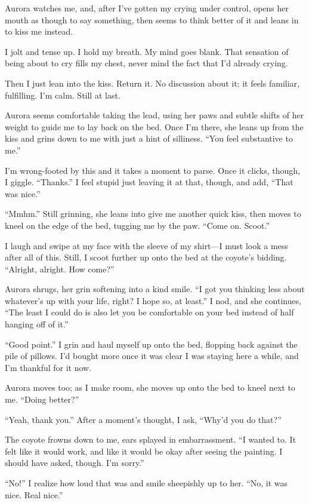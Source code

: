 Aurora watches me, and, after I've gotten my crying under control, opens her mouth as though to say something, then seems to think better of it and leans in to kiss me instead.

I jolt and tense up. I hold my breath. My mind goes blank. That sensation of being about to cry fills my chest, never mind the fact that I'd already crying.

Then I just lean into the kiss. Return it. No discussion about it; it feels familiar, fulfilling. I'm calm. Still at last.

Aurora seems comfortable taking the lead, using her paws and subtle shifts of her weight to guide me to lay back on the bed. Once I'm there, she leans up from the kiss and grins down to me with just a hint of silliness. ``You feel substantive to me.''

I'm wrong-footed by this and it takes a moment to parse. Once it clicks, though, I giggle. ``Thanks.'' I feel stupid just leaving it at that, though, and add, ``That was nice.''

``Mmhm.'' Still grinning, she leans into give me another quick kiss, then moves to kneel on the edge of the bed, tugging me by the paw. ``Come on. Scoot.''

I laugh and swipe at my face with the sleeve of my shirt---I must look a mess after all of this. Still, I scoot further up onto the bed at the coyote's bidding. ``Alright, alright. How come?''

Aurora shrugs, her grin softening into a kind smile. ``I got you thinking less about whatever's up with your life, right? I hope so, at least.'' I nod, and she continues, ``The least I could do is also let you be comfortable on your bed instead of half hanging off of it.''

``Good point.'' I grin and haul myself up onto the bed, flopping back against the pile of pillows. I'd bought more once it was clear I was staying here a while, and I'm thankful for it now.

Aurora moves too; as I make room, she moves up onto the bed to kneel next to me. ``Doing better?''

``Yeah, thank you.'' After a moment's thought, I ask, ``Why'd you do that?''

The coyote frowns down to me, ears splayed in embarrassment. ``I wanted to. It felt like it would work, and like it would be okay after seeing the painting. I should have asked, though. I'm sorry.''

``No!'' I realize how loud that was and smile sheepishly up to her. ``No, it was nice. Real nice.''

